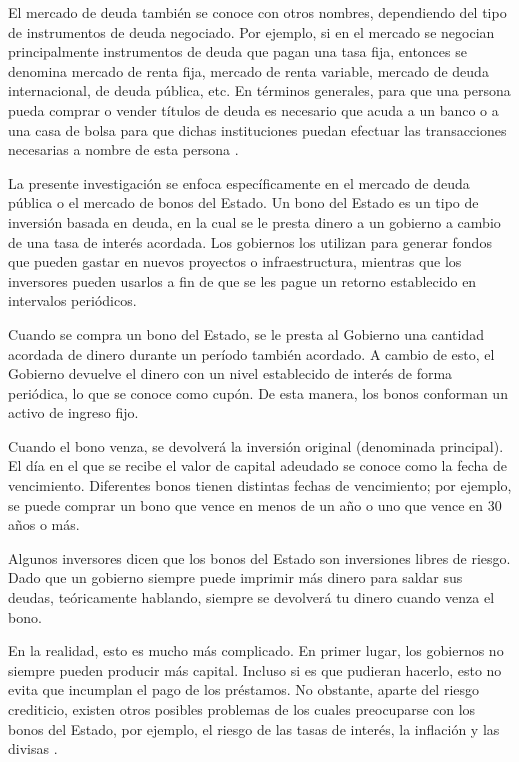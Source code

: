     El mercado de deuda también se conoce con otros nombres, dependiendo del tipo de instrumentos de deuda negociado. Por ejemplo, si en el 
    mercado se negocian principalmente instrumentos de deuda que pagan una tasa fija, entonces se denomina mercado de renta fija, mercado 
    de renta variable, mercado de deuda internacional, de deuda pública, etc. En términos generales, para que una persona pueda comprar 
    o vender títulos de deuda es necesario que acuda a un banco o a una casa de bolsa para que dichas instituciones puedan efectuar las 
    transacciones necesarias a nombre de esta persona \parencite{bancomexico}.

    La presente investigación se enfoca específicamente en el mercado de deuda pública o el mercado de bonos del Estado. Un bono del 
    Estado es un tipo de inversión basada en deuda, en la cual se le presta dinero a un gobierno a cambio de una tasa de interés acordada. 
    Los gobiernos los utilizan para generar fondos que pueden gastar en nuevos proyectos o infraestructura, mientras que los inversores 
    pueden usarlos a fin de que se les pague un retorno establecido en intervalos periódicos.

    Cuando se compra un bono del Estado, se le presta al Gobierno una cantidad acordada de dinero durante un período también acordado. A 
    cambio de esto, el Gobierno devuelve el dinero con un nivel establecido de interés de forma periódica, lo que se conoce como 
    cupón. De esta manera, los bonos conforman un activo de ingreso fijo.

    Cuando el bono venza, se devolverá la inversión original (denominada principal). El día en el que se recibe el valor de capital 
    adeudado se conoce como la fecha de vencimiento. Diferentes bonos tienen distintas fechas de vencimiento; por ejemplo, se puede 
    comprar un bono que vence en menos de un año o uno que vence en 30 años o más.

    Algunos inversores dicen que los bonos del Estado son inversiones libres de riesgo. Dado que un gobierno siempre puede imprimir más 
    dinero para saldar sus deudas, teóricamente hablando, siempre se devolverá tu dinero cuando venza el bono.

    En la realidad, esto es mucho más complicado. En primer lugar, los gobiernos no siempre pueden producir más capital. Incluso si es 
    que pudieran hacerlo, esto no evita que incumplan el pago de los préstamos. No obstante, aparte del riesgo crediticio, existen otros 
    posibles problemas de los cuales preocuparse con los bonos del Estado, por ejemplo, el riesgo de las tasas de interés, la inflación 
    y las divisas \parencite{igbonos}.

